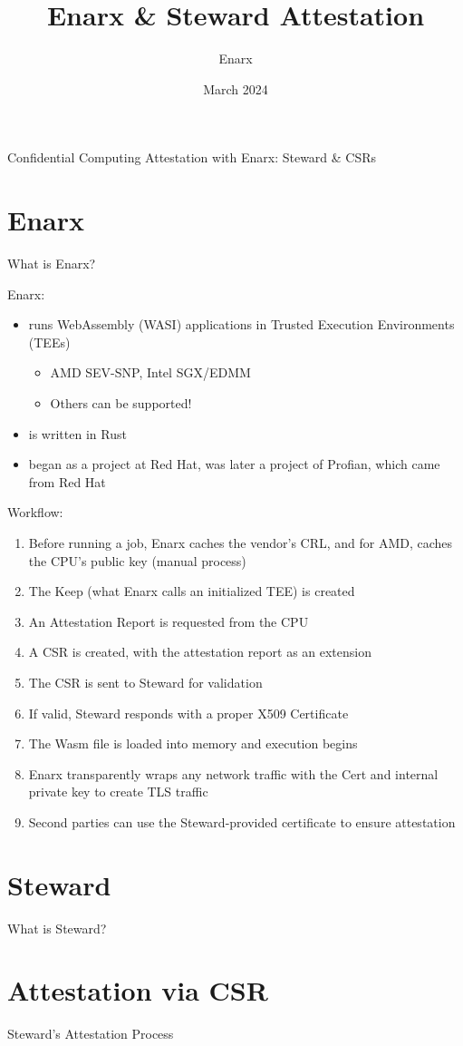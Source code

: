 \documentclass[graphics]{beamer}
\title{Enarx \& Steward Attestation}
\author{Enarx}
\date{March 2024}
\begin{document}
\begin{frame}{}
\centering
    Confidential Computing Attestation with Enarx: Steward \& CSRs
\end{frame}

\frame{\tableofcontents}

\section{Enarx}
\begin{frame}{What is Enarx?}

Enarx:
\begin{itemize}
\item runs WebAssembly (WASI) applications in Trusted Execution Environments (TEEs)
\begin{itemize}
\item AMD SEV-SNP, Intel SGX/EDMM
\item Others can be supported!
\end{itemize}
\item is written in Rust
\item began as a project at Red Hat, was later a project of Profian, which came from Red Hat
\end{itemize}

\end{frame}

\begin{frame}
Workflow:
\begin{enumerate}
    \item Before running a job, Enarx caches the vendor's CRL, and for AMD, caches the CPU's public key (manual process)
    \item The Keep (what Enarx calls an initialized TEE) is created
    \item An Attestation Report is requested from the CPU
    \item A CSR is created, with the attestation report as an extension
    \item The CSR is sent to Steward for validation
    \item If valid, Steward responds with a proper X509 Certificate
    \item The Wasm file is loaded into memory and execution begins
    \item Enarx transparently wraps any network traffic with the Cert and internal private key to create TLS traffic
    \item Second parties can use the Steward-provided certificate to ensure attestation
\end{enumerate}

\end{frame}

\section{Steward}
\begin{frame}{What is Steward?}
\end{frame}

\section{Attestation via CSR}
\begin{frame}{Steward's Attestation Process}
\end{frame}
\end{document}
